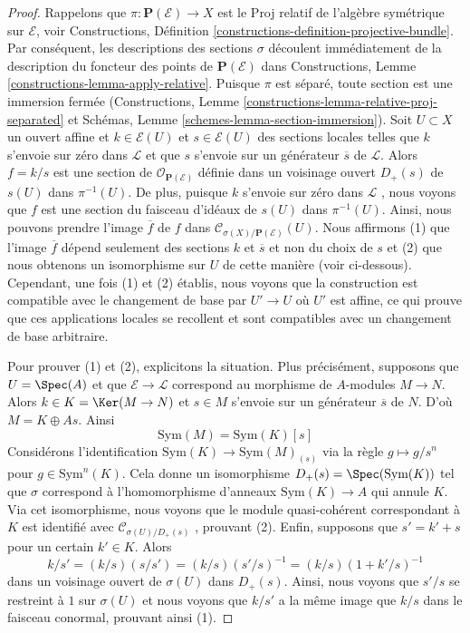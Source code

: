 \begin{proof}
Rappelons que  $\pi : \mathbf{P}(\mathcal{E}) \to X$  est le Proj relatif de l'algèbre symétrique sur
 $\mathcal{E}$, voir Constructions, Définition  \ref{constructions-definition-projective-bundle}. Par conséquent, les
descriptions des sections  $\sigma$  découlent immédiatement de la description du
foncteur des points de  $\mathbf{P}(\mathcal{E})$  dans Constructions, Lemme  \ref{constructions-lemma-apply-relative}.
Puisque  $\pi$  est séparé, toute section est une immersion fermée
(Constructions, Lemme  \ref{constructions-lemma-relative-proj-separated}  et Schémas, Lemme  \ref{schemes-lemma-section-immersion}). Soit
 $U \subset X$  un ouvert affine et  $k \in \mathcal{E}(U)$  et  $s \in \mathcal{E}(U)$  des sections locales
telles que  $k$  s'envoie sur zéro dans  $\mathcal{L}$  et que  $s$ 
s'envoie sur un générateur  $\overline{s}$  de  $\mathcal{L}$. Alors  $f = k/s$  est
une section de  $\mathcal{O}_{\mathbf{P}(\mathcal{E})}$  définie dans un voisinage ouvert  $D_+(s)$  de
 $s(U)$  dans  $\pi^{-1}(U)$. De plus, puisque  $k$  s'envoie sur zéro
dans  $\mathcal{L}$ , nous voyons que  $f$  est une section du faisceau
d'idéaux de  $s(U)$  dans  $\pi^{-1}(U)$. Ainsi, nous pouvons prendre l'image
 $\overline{f}$  de  $f$  dans  $\mathcal{C}_{\sigma(X)/\mathbf{P}(\mathcal{E})}(U)$. Nous affirmons (1) que l'image
 $\overline{f}$  dépend seulement des sections  $k$  et  $\overline{s}$  et non du
choix de  $s$  et (2) que nous obtenons un isomorphisme sur  $U$  de
cette manière (voir ci-dessous). Cependant, une fois (1) et (2) établis, nous
voyons que la construction est compatible avec le changement de base par
 $U' \to U$  où  $U'$  est affine, ce qui prouve que ces applications
locales se recollent et sont compatibles avec un changement de base arbitraire.

\medskip\noindent
Pour prouver (1) et (2), explicitons la situation. Plus précisément, supposons
que  $U = \Spec(A)$  et que  $\mathcal{E} \to \mathcal{L}$  correspond au morphisme de
 $A$-modules  $M \to N$. Alors  $k \in K = \Ker(M \to N)$  et  $s \in M$  s'envoie
sur un générateur  $\overline{s}$  de  $N$. D'où  $M = K \oplus A s$. Ainsi
$$
\text{Sym}(M) = \text{Sym}(K)[s]
$$
Considérons l'identification  $\text{Sym}(K) \to \text{Sym}(M)_{(s)}$  via la règle  $g \mapsto g/s^n$  pour
 $g \in \text{Sym}^n(K)$. Cela donne un isomorphisme  $D_+(s) = \Spec(\text{Sym}(K))$  tel que  $\sigma$ 
correspond à l'homomorphisme d'anneaux  $\text{Sym}(K) \to A$  qui annule  $K$.
Via cet isomorphisme, nous voyons que le module quasi-cohérent correspondant à
 $K$  est identifié avec  $\mathcal{C}_{\sigma(U)/D_+(s)}$ , prouvant (2). Enfin, supposons que
 $s' = k' + s$  pour un certain  $k' \in K$. Alors
$$
k/s' = (k/s) (s/s') = (k/s) (s'/s)^{-1} = (k/s) (1 + k'/s)^{-1}
$$
dans un voisinage ouvert de  $\sigma(U)$  dans  $D_+(s)$. Ainsi, nous voyons que
 $s'/s$  se restreint à  $1$  sur  $\sigma(U)$  et nous voyons que
 $k/s'$  a la même image que  $k/s$  dans le faisceau conormal,
prouvant ainsi (1).
\end{proof}






